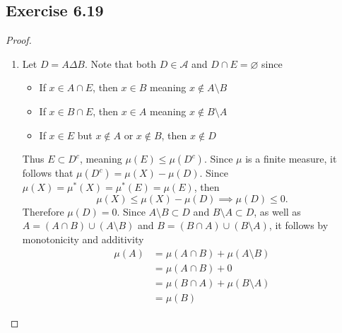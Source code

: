 \documentclass[hw_all.tex]{subfiles}
\begin{document}
\subsection{Exercise 6.19}

\begin{proof}
    \begin{enumerate}
        \item
            Let $D = A \Delta B$. Note that both $D \in \mathcal{A}$ and $D \cap E = \varnothing$ since
            \begin{itemize}
                \item If $x \in A \cap E$, then $x \in B$ meaning $x \notin A \setminus B$
                \item If $x \in B \cap E$, then $x \in A$ meaning $x \notin B \setminus A$
                \item If $x \in E$ but $x \notin A$ or $x \notin B$, then $x \notin D$
            \end{itemize}
            Thus $E \subset D^c$, meaning $\mu(E) \leq \mu(D^c)$. Since $\mu$ is a finite measure, it follows that $\mu(D^c) = \mu(X) - \mu(D)$. Since $\mu(X) = \mu^*(X) = \mu^*(E) = \mu(E)$, then
            \[
                \mu(X) \leq \mu(X) - \mu(D) \implies \mu(D) \leq 0
            .\]
            Therefore $\mu(D) = 0$. Since $A \setminus B \subset D$ and $B \setminus A \subset D$, as well as $A = (A \cap B) \cup (A \setminus B)$ and $B = (B \cap A) \cup (B \setminus A)$, it follows by monotonicity and additivity
            \begin{align*}
                \mu(A) &= \mu(A \cap B) + \mu(A \setminus B) \\
                       &= \mu(A \cap B) + 0                  \\
                       &= \mu(B \cap A) + \mu(B \setminus A) \\
                       &= \mu(B)
            \end{align*}


\end{enumerate}
\end{proof}
\end{document}
